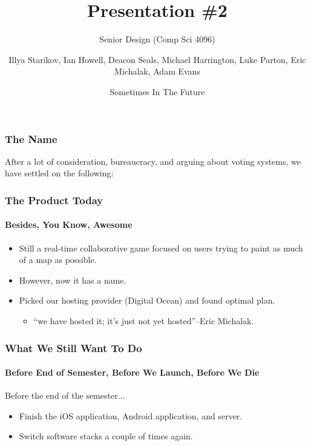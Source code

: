 \documentclass[handout,xclolor=dvipsnames]{beamer}    %
\title{Presentation \#2}
\subtitle{Senior Design (Comp Sci 4096)}
\author{Illya Starikov, Ian Howell, Deacon Seals, Michael Harrington, Luke Parton, Eric Michalak, Adam Evans}
\date{Sometimes In The Future}
\institute{Missouri University of Science and Technology}
\begin{document}
\begin{darkframes}
    \maketitle

    \begin{frame}
        \frametitle{The Name}

        After a lot of consideration, bureaucracy, and arguing about voting systems, we have settled on the following: \pause{}

        \vspace{3mm}
        \begin{quote}
        \end{quote}
    \end{frame}




    \begin{frame}
        \frametitle{The Product Today}
        \framesubtitle{Besides, You Know, \textbf{Awesome}}

        \begin{itemize}
            \item Still a real-time collaborative game focused on users trying to paint as much of a map as possible.
            \item However, now it has a name.
            \item Picked our hosting provider (Digital Ocean) and found optimal plan.
                \begin{itemize}
                    \item ``we have hosted it; it's just not yet hosted''--Eric Michalak.
                \end{itemize}
        \end{itemize}
    \end{frame}


    \begin{frame}
        \frametitle{What We Still Want To Do}
        \framesubtitle{Before End of Semester, Before We Launch, Before We Die}

        Before the end of the semester$\ldots$
        \begin{itemize}
            \item Finish the iOS application, Android application, and server.
            \item Switch software stacks a couple of times again.
        \end{itemize}\pause{}


\end{frame}
\end{darkframes}
\end{document}
